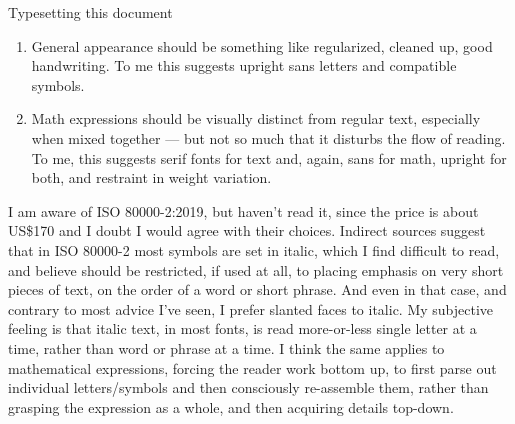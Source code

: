 \begin{plSection}{Typesetting this document}
\begin{enumerate}
\item General appearance should be something like regularized,
    cleaned up, good handwriting. To me this suggests upright
    sans letters and compatible symbols.

\item Math expressions should be visually distinct from regular
    text, especially when mixed together --- but not so much
    that it disturbs the flow of reading. To me, this suggests
    serif fonts for text and, again, sans for math, upright
    for both, and restraint in weight variation.
\end{enumerate}

I am aware of ISO 80000-2:2019, but haven't read it,
since the price is about US\$170 and I doubt I would agree with
their choices. Indirect sources suggest that in ISO 80000-2
most symbols are set in italic, which I find difficult to read,
and believe should be restricted, if used at all, to placing
emphasis on very short pieces of text, on the order of a word
or short phrase.
And even in that case, and contrary to most
advice I've seen, I prefer slanted faces to italic.
My subjective feeling is that italic text,
in most fonts, is read more-or-less single letter at a time,
rather than word or phrase at a time. I think the same applies
to mathematical expressions, forcing the reader work bottom up,
to first parse out individual letters/symbols and then
consciously re-assemble them, rather than grasping
the expression as a whole, and then acquiring details top-down.


\vfill

\end{plSection}%
